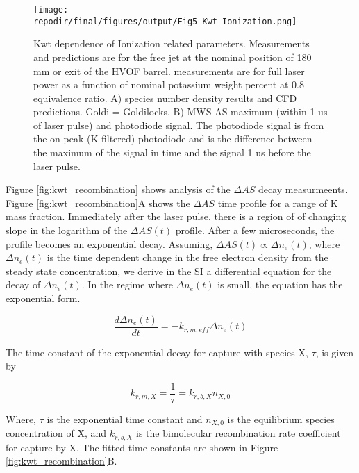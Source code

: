 \begin{figure}[h]
    \texttt{[image: \\repodir/final/figures/output/Fig5\_Kwt\_Ionization.png]} 
    \caption{Kwt dependence of Ionization related parameters. Measurements and predictions are for the free jet at the nominal position of 180 mm or exit of the HVOF barrel. measurements are for full laser power as a function of nominal potassium weight percent at 0.8 equivalence ratio. A) species number density results and CFD predictions. Goldi = Goldilocks. B) MWS AS maximum (within 1 us of laser pulse) and photodiode signal. The photodiode signal is from the on-peak (K filtered) photodiode and is the difference between the maximum of the signal in time and the signal 1 us before the laser pulse.  }
    \label{fig:kwt_ionization}
\end{figure}



Figure \ref{fig:kwt_recombination} shows analysis of the $\Delta AS$ decay measurmeents.  Figure \ref{fig:kwt_recombination}A shows the $\Delta AS$ time profile for a range of K mass fraction. Immediately after the laser pulse, there is a region of of changing slope in the logarithm of the $\Delta AS (t)$ profile. After a few microseconds, the profile becomes an exponential decay. Assuming, $\Delta AS (t) \propto \Delta n_e (t)$, where $\Delta n_e (t)$ is the time dependent change in the free electron density from the steady state concentration, we derive in the SI a differential equation for the decay of $\Delta n_e (t)$. In the regime where $\Delta n_e (t)$ is small, the equation has the exponential form.  

\begin{equation}
    \label{eq:fit_eq}
    \frac{d\Delta n_e (t)}{dt} = - k_{r, m, eff} \Delta n_e (t) 
\end{equation}

The time constant of the exponential decay for capture with species X, $\tau$, is given by

\begin{equation}
    \label{eq:tau_krm}
    k_{r, m, X} = \frac{1}{\tau} = k_{r, b, X}n_{X,0}
\end{equation}

Where, $\tau$ is the exponential time constant and $n_{X,0}$ is the equilibrium species concentration of X, and $k_{r, b, X}$ is the bimolecular recombination rate coefficient for capture by X. The fitted time constants are shown in Figure \ref{fig:kwt_recombination}B.


